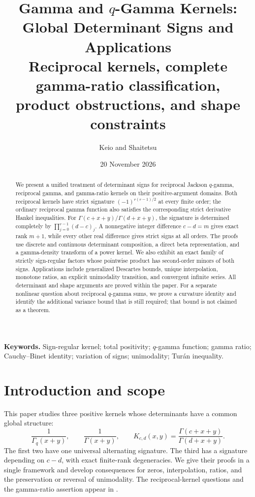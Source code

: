 \documentclass[11pt,a4paper]{article}
\title{\textbf{Gamma and \(q\)-Gamma Kernels:}\\[0.25em]
\textbf{Global Determinant Signs and Applications}\\[0.5em]
\large Reciprocal kernels, complete gamma-ratio classification,\\
product obstructions, and shape constraints}
\author{Keio and Shaitetsu}
\date{20 November 2026}
\theoremstyle{definition}
\theoremstyle{remark}
\begin{document}
\maketitle
\begin{abstract}
We present a unified treatment of determinant signs for reciprocal
Jackson \(q\)-gamma, reciprocal gamma, and gamma-ratio kernels on
their positive-argument domains. Both reciprocal kernels have strict
signature \((-1)^{r(r-1)/2}\) at every finite order; the ordinary
reciprocal gamma function also satisfies the corresponding strict
derivative Hankel inequalities. For
\(\Gamma(c+x+y)/\Gamma(d+x+y)\), the signature is determined
completely by \(\prod_{j=0}^{r-1}(d-c)_j\). A nonnegative integer
difference \(c-d=m\) gives exact rank \(m+1\), while every other
real difference gives strict signs at all orders. The proofs use
discrete and continuous determinant composition, a direct beta
representation, and a gamma-density transform of a power kernel.
We also exhibit an exact family of strictly sign-regular factors whose
pointwise product has second-order minors of both signs. Applications
include generalized Descartes bounds, unique interpolation, monotone
ratios, an explicit unimodality transition, and convergent infinite
series. All determinant and shape arguments are proved within the
paper. For a separate nonlinear question about reciprocal \(q\)-gamma
sums, we prove a curvature identity and identify the additional
variance bound that is still required; that bound is not claimed as
a theorem.
\end{abstract}

\noindent\textbf{Keywords.} Sign-regular kernel; total positivity;
\(q\)-gamma function; gamma ratio; Cauchy--Binet identity;
variation of signs; unimodality; Tur\'an inequality.

\section{Introduction and scope}

This paper studies three positive kernels whose determinants have a
common global structure:
\[
 \frac{1}{\Gamma_q(x+y)},\qquad
 \frac{1}{\Gamma(x+y)},\qquad
 K_{c,d}(x,y)=\frac{\Gamma(c+x+y)}{\Gamma(d+x+y)}.
\]
The first two have one universal alternating signature. The third has
a signature depending on \(c-d\), with exact finite-rank degeneracies.
We give their proofs in a single framework and develop consequences for
zeros, interpolation, ratios, and the preservation or reversal of
unimodality. The reciprocal-kernel questions and the gamma-ratio
assertion appear in \cite[Section~3, Examples~6, 8, and~11]{KVZ}.
\end{document}
